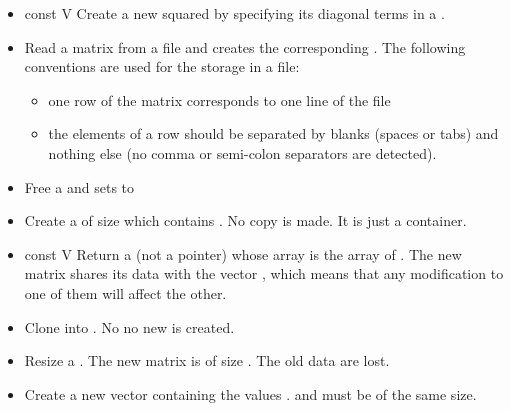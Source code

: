 \begin{itemize}
\item {}
  {const  \ptr V}
  \sshortdescribe Create a new squared  by specifying its diagonal
  terms in a .

\item {}
  \sshortdescribe Read a matrix from a file and creates the corresponding
  . The following conventions are used for the storage in a
  file:
  \begin{itemize}
  \item one row of the matrix corresponds to one line of the file
  \item the elements of a row should be separated by blanks (spaces or tabs) and
    nothing else (no comma or semi-colon separators are detected).
  \end{itemize}

\item {}
  \sshortdescribe Free a  and sets  to  
\item {}
    \sshortdescribe Create a  of size  
    which contains . No copy is made. It is just a container.
\item {}
  {const  \ptr V}
  \sshortdescribe Return a  (not a pointer) whose array is
  the array of . The new matrix shares its data with the
  vector , which means that any modification to one of them will affect
  the other.


\item {}
  \sshortdescribe Clone  into . No no new
   is created.

\item {}
  \sshortdescribe Resize a . The new matrix is of size
  . The old data are lost.
\item {}
  \sshortdescribe Create a new vector containing the values .  and  must be of the same size.


\end{itemize}
